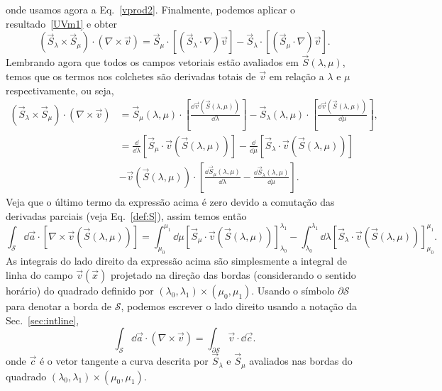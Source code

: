 onde usamos agora a Eq.~\eqref{vprod2}. Finalmente, podemos aplicar o
resultado~\eqref{UVm1} e obter
\begin{equation}
	\left(\vec{S}_\lambda\times\vec{S}_\mu\right)\cdot\left(\nabla\times\vec{v}\right) = \vec{S}_\mu\cdot\left[\left(\vec{S}_\lambda\cdot\nabla\right)\vec{v}\right] - \vec{S}_\lambda\cdot\left[\left(\vec{S}_\mu\cdot\nabla\right)\vec{v}\right].
\end{equation}
Lembrando agora que todos os campos vetoriais estão avaliados em
$\vec{S}(\lambda,\mu)$, temos que os termos nos colchetes são derivadas totais
de $\vec{v}$ em relação a $\lambda$ e $\mu$ respectivamente, ou seja,
\begin{align}
	\left(\vec{S}_\lambda\times\vec{S}_\mu\right)\cdot\left(\nabla\times\vec{v}\right) & = \vec{S}_\mu(\lambda,\mu)\cdot\left[\frac{\dd \vec{v}(\vec{S}(\lambda,\mu))}{\dd \lambda}\right] - \vec{S}_\lambda(\lambda,\mu)\cdot\left[\frac{\dd \vec{v}(\vec{S}(\lambda,\mu))}{\dd \mu}\right], \\
	\nonumber                                                                          & =\frac{\dd }{\dd \lambda}\left[\vec{S}_\mu\cdot\vec{v}(\vec{S}(\lambda,\mu))\right] - \frac{\dd }{\dd \mu}\left[\vec{S}_\lambda\cdot\vec{v}(\vec{S}(\lambda,\mu))\right]                             \\
	                                                                                   & -\vec{v}(\vec{S}(\lambda,\mu))\cdot\left[\frac{\dd \vec{S}_\mu(\lambda,\mu)}{\dd \lambda}-\frac{\dd \vec{S}_\lambda(\lambda,\mu)}{\dd \mu}\right].
\end{align}
Veja que o último termo da expressão acima é zero devido a comutação das
derivadas parciais (veja Eq.~\eqref{def:S}), assim temos então
\begin{equation}
	\int_{\mathcal{S}} \dd \vec{a}\cdot \left[\nabla\times\vec{v}\left(\vec{S}(\lambda,\mu)\right)\right] = \int_{\mu_0}^{\mu_1}\dd \mu\left[\vec{S}_\mu\cdot\vec{v}(\vec{S}(\lambda,\mu))\right]_{\lambda_0}^{\lambda_1} - \int_{\lambda_0}^{\lambda_1}\dd \lambda\left[\vec{S}_\lambda\cdot\vec{v}(\vec{S}(\lambda,\mu))\right]_{\mu_0}^{\mu_1}.
\end{equation}
As integrais do lado direito da expressão acima são simplesmente a integral de
linha do campo $\vec{v}(\vec{x})$ projetado na direção das bordas (considerando
o sentido horário) do quadrado definido por $(\lambda_0, \lambda_1) \times
	(\mu_0, \mu_1)$. Usando o símbolo $\partial\mathcal{S}$ para denotar a borda de
$\mathcal{S}$, podemos escrever o lado direito usando a notação da
Sec.~\ref{sec:intline},
\begin{equation}\label{stokes}
	\int_{\mathcal{S}} \dd \vec{a}\cdot \left(\nabla\times\vec{v}\right) = \int_{\partial\mathcal{S}}\vec{v}\cdot\dd \vec{c}.
\end{equation}
onde $\vec{c}$ é o vetor tangente a curva descrita por $\vec{S}_\lambda$ e
$\vec{S}_\mu$ avaliados nas bordas do quadrado $(\lambda_0, \lambda_1) \times
	(\mu_0, \mu_1)$.

